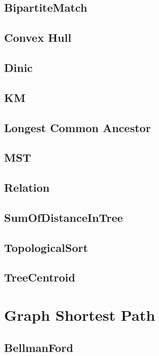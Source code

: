 \subsection{BipartiteMatch}

\subsection{Convex Hull}

\subsection{Dinic}

\subsection{KM}

\subsection{Longest Common Ancestor}

\subsection{MST}

\subsection{Relation}

\subsection{SumOfDistanceInTree}

\subsection{TopologicalSort}

\subsection{TreeCentroid}


\section{Graph Shortest Path}

\subsection{BellmanFord}


